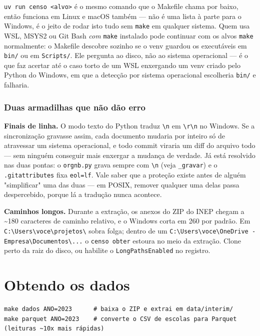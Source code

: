 \documentclass[11pt]{article}
\begin{document}
\texttt{uv run censo <alvo>} é o mesmo comando que o Makefile chama por baixo, então
funciona em Linux e macOS também — não é uma lista à parte para o Windows, é o
jeito de rodar isto tudo sem \texttt{make} em qualquer sistema. Quem usa WSL, MSYS2 ou
Git Bash \emph{com} \texttt{make} instalado pode continuar com os alvos \texttt{make} normalmente:
o Makefile descobre sozinho se o venv guardou os executáveis em \texttt{bin/} ou em
\texttt{Scripts/}. Ele pergunta ao disco, não ao sistema operacional — é o que faz
acertar até o caso torto de um WSL enxergando um venv criado pelo Python do
Windows, em que a detecção por sistema operacional escolheria \texttt{bin/} e falharia.
\subsubsection*{Duas armadilhas que não dão erro}
\label{sec:orgcbaa856}

\textbf{Finais de linha.} O modo texto do Python traduz \texttt{\textbackslash{}n} em \texttt{\textbackslash{}r\textbackslash{}n} no Windows. Se a
sincronização gravasse assim, cada documento mudaria por inteiro só de
atravessar um sistema operacional, e todo commit viraria um diff do arquivo
todo — sem ninguém conseguir mais enxergar a mudança de verdade. Já está
resolvido nas duas pontas: o \texttt{orgnb.py} grava sempre com \texttt{\textbackslash{}n} (veja \texttt{\_gravar}) e
o \texttt{.gitattributes} fixa \texttt{eol=lf}. Vale saber que a proteção existe antes de
alguém "simplificar" uma das duas — em POSIX, remover qualquer uma delas passa
despercebido, porque lá a tradução nunca acontece.

\textbf{Caminhos longos.} Durante a extração, os anexos do ZIP do INEP chegam a \textasciitilde{}180
caracteres de caminho relativo, e o Windows corta em 260 por padrão. Em
\texttt{C:\textbackslash{}Users\textbackslash{}voce\textbackslash{}projetos\textbackslash{}} sobra folga; dentro de um \texttt{C:\textbackslash{}Users\textbackslash{}voce\textbackslash{}OneDrive -
Empresa\textbackslash{}Documentos\textbackslash{}...} o \texttt{censo obter} estoura no meio da extração. Clone perto
da raiz do disco, ou habilite o \texttt{LongPathsEnabled} no registro.
\section*{Obtendo os dados}
\label{sec:org6b01a61}

\begin{verbatim}
make dados ANO=2023      # baixa o ZIP e extrai em data/interim/
make parquet ANO=2023    # converte o CSV de escolas para Parquet (leituras ~10x mais rápidas)
\end{verbatim}
\end{document}
